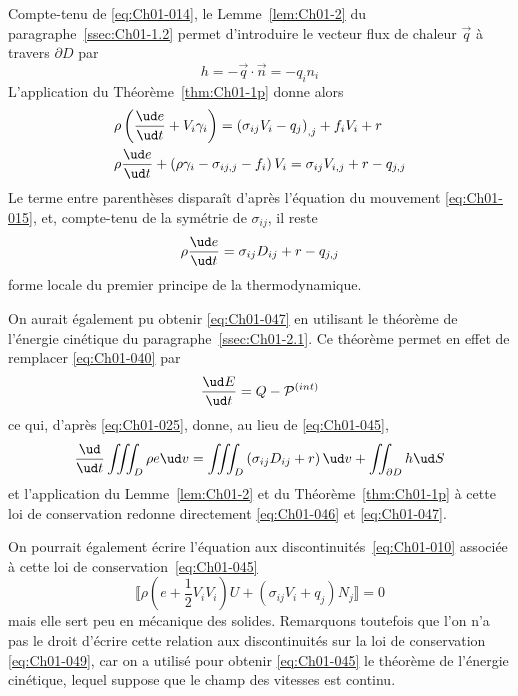 Compte-tenu de \eqref{eq:Ch01-014}, le Lemme~\ref{lem:Ch01-2} du paragraphe~\ref{ssec:Ch01-1.2} permet d'introduire le vecteur flux de chaleur $\vec{q}$ à travers $\partial D$ par
\begin{equation}
    h = - \vec{q} \cdot \vec{n} = -q_i n_i
    \label{eq:Ch01-046}
\end{equation}
L'application du Théorème~\ref{thm:Ch01-1p} donne alors
\begin{align*}
    & \rho \left( \frac{\ud e}{\ud t} + V_i \gamma_i \right) = \left( \sigma_{ij} V_i - q_j \right)_{,j} + f_i V_i + r\\
    & \rho \frac{\ud e}{\ud t} + \left( \rho \gamma_i - \sigma_{ij,j} - f_i \right) V_i = \sigma_{ij} V_{i,j} + r - q_{j,j}
\end{align*}
Le terme entre parenthèses disparaît d'après l'équation du mouvement \eqref{eq:Ch01-015}, et, compte-tenu de la symétrie de $\sigma_{ij}$, il reste
\begin{equation}
    \rho \frac{\ud e }{\ud t} = \sigma_{ij} D_{ij} + r - q_{j,j}
    \label{eq:Ch01-047}
\end{equation}
forme locale du premier principe de la thermodynamique.

On aurait également pu obtenir \eqref{eq:Ch01-047} en utilisant le théorème de l'énergie cinétique du paragraphe~\ref{ssec:Ch01-2.1}.
Ce théorème permet en effet de remplacer \eqref{eq:Ch01-040} par
\begin{equation}
    \frac{\ud E}{\ud t} = Q - \mathcal{P}^{(int)}
    \label{eq:Ch01-048}
\end{equation}
ce  qui, d'après \eqref{eq:Ch01-025}, donne, au lieu de \eqref{eq:Ch01-045},
\begin{equation}
    \frac{\ud}{\ud t} \iiint_{D} \rho e \ud v = \iiint_{D} \left( \sigma_{ij} D_{ij} + r \right) \ud v + \iint_{\partial D} h \ud S
    \label{eq:Ch01-049}
\end{equation}
et l'application du Lemme~\ref{lem:Ch01-2} et du Théorème~\ref{thm:Ch01-1p} à cette loi de conservation redonne directement \eqref{eq:Ch01-046} et \eqref{eq:Ch01-047}.

On pourrait également écrire l'équation aux discontinuités~\eqref{eq:Ch01-010} associée à cette loi de conservation~\eqref{eq:Ch01-045}
\begin{equation}
    \llbracket \rho \left( e + \frac{1}{2} V_i V_i \right) U + \left( \sigma_{ij} V_i + q_j \right) N_j \rrbracket = 0
    \label{eq:Ch01-050}
\end{equation}
mais elle sert peu en mécanique des solides.
Remarquons toutefois que l'on n'a pas le droit d'écrire cette relation aux discontinuités sur la loi de conservation \eqref{eq:Ch01-049}, car on a utilisé pour obtenir \eqref{eq:Ch01-045} le théorème de l'énergie cinétique, lequel suppose que le champ des vitesses est continu.

